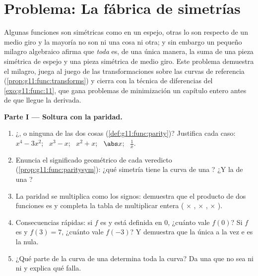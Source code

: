 \section{Problema: La fábrica de simetrías}

\begin{problem}
\label{pb:g11:func:1}
Algunas funciones son simétricas como en un espejo, otras lo son respecto
de un medio giro y la mayoría no son ni una cosa ni otra; y sin embargo un
pequeño milagro algebraico afirma que \emph{toda}  es, de una única
manera, la suma de una pieza simétrica de espejo y una pieza simétrica de
medio giro. Este problema demuestra el milagro, juega al juego de las
transformaciones sobre las curvas de referencia
(\cref{prop:g11:func:transforms}) y cierra con la técnica de 
diferencias del \cref{exo:g11:func:11}, que gana problemas de minimización
un capítulo entero antes de que llegue la derivada.

\medskip
\noindent\textbf{Parte I --- Soltura con la paridad.}
\begin{enumerate}
  \item ¿,  o ninguna de las dos cosas
        (\cref{def:g11:func:parity})? Justifica cada caso: $x^4 - 3x^2$;
        \ $x^3 - x$; \ $x^2 + x$; \ $\abs x$; \ $\frac1x$.
  \item Enuncia el significado geométrico de cada veredicto
        (\cref{prop:g11:func:paritysym}): ¿qué simetría tiene la curva de
        una ? ¿Y la de una ?
  \item La paridad se multiplica como los signos: demuestra que el
        producto de dos funciones  es  y completa la tabla de
        multiplicar entera ( $\times$ ,  $\times$ , 
        $\times$ ).
  \item Consecuencias rápidas: si $f$ es  y está definida en $0$,
        ¿cuánto vale $f(0)$? Si $f$ es  y $f(3) = 7$, ¿cuánto vale
        $f(-3)$? Y demuestra que la única  a la vez  e  es
        la  nula.
  \item ¿Qué parte de la curva de una  determina toda la
        curva? Da una  que no sea ni  ni  y explica qué
        falla.
\end{enumerate}


\end{problem}
